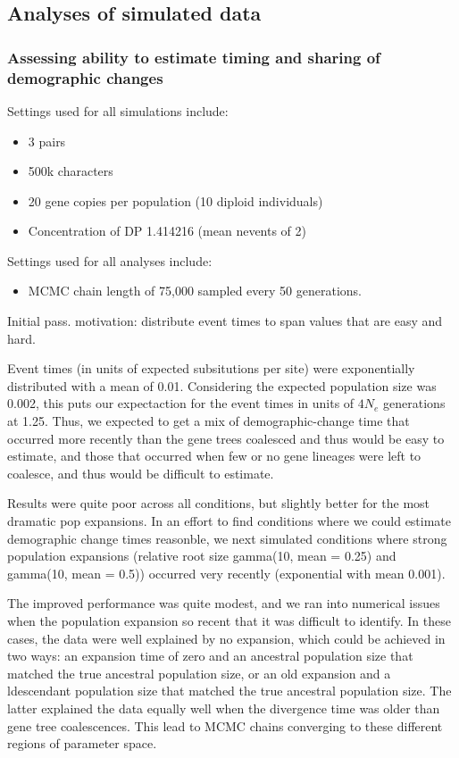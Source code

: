 \subsection{Analyses of simulated data}

\subsubsection{Assessing ability to estimate timing and sharing of demographic changes}

Settings used for all simulations include:
\begin{itemize}
    \item 3 pairs
    \item 500k characters
    \item 20 gene copies per population (10 diploid individuals)
    \item Concentration of DP 1.414216 (mean nevents of 2)
\end{itemize}

Settings used for all analyses include:
\begin{itemize}
    \item MCMC chain length of 75,000 sampled every 50 generations.
\end{itemize}

Initial pass. motivation: distribute event times to span values that are easy and hard.

Event times (in units of expected subsitutions per site) were exponentially
distributed with a mean of 0.01.
Considering the expected population size was 0.002, this puts our expectaction
for the event times in units of $4N_e$ generations at 1.25.
Thus, we expected to get a mix of demographic-change time that occurred more recently
than the gene trees coalesced and thus would be easy to estimate,
and those that occurred when few or no gene lineages were left to coalesce, and thus would
be difficult to estimate.

Results were quite poor across all conditions, but slightly better for the most dramatic pop expansions.
In an effort to find conditions where we could estimate demographic change times reasonble, we next simulated conditions where strong population expansions (relative root size gamma(10, mean = 0.25) and gamma(10, mean = 0.5)) occurred very recently (exponential with mean 0.001).

The improved performance was quite modest, and we ran into numerical issues when the
population expansion so recent that it was difficult to identify.
In these cases, the data were well explained by no expansion, which could be achieved in two ways: an expansion time of zero and an ancestral population size that matched the true ancestral population size, or an old expansion and a ldescendant population size that matched the true ancestral population size. The latter explained the data equally well when the divergence time was older than gene tree coalescences. This lead to MCMC chains converging to these different regions of parameter space.

